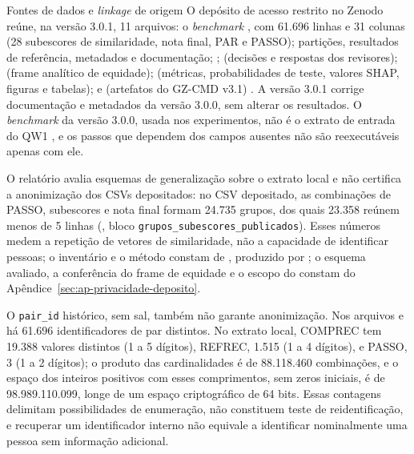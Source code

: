 \begin{chapter}{Fontes de dados e \textit{linkage} de origem}
O depósito de acesso restrito no Zenodo reúne, na versão 3.0.1, 11 arquivos: o \textit{benchmark} , com 61.696 linhas e 31 colunas (28 subescores de similaridade, nota final, PAR e PASSO); partições, resultados de referência, metadados e documentação; ;  (decisões e respostas dos revisores);  (frame analítico de equidade);  (métricas, probabilidades de teste, valores SHAP, figuras e tabelas); e  (artefatos do GZ-CMD v3.1) \cite{Jardim2026zenodo,Jardim2026zenodoGzcmd301}. A versão 3.0.1 corrige documentação e metadados da versão 3.0.0, sem alterar os resultados. O \textit{benchmark} da versão 3.0.0, usada nos experimentos, não é o extrato de entrada do QW1 \cite{Jardim2026zenodoGzcmd}, e os passos que dependem dos campos ausentes não são reexecutáveis apenas com ele.

O relatório  avalia esquemas de generalização sobre o extrato local e não certifica a anonimização dos CSVs depositados: no CSV depositado, as combinações de PASSO, subescores e nota final formam 24.735 grupos, dos quais 23.358 reúnem menos de 5 linhas (, bloco \texttt{grupos\_\allowbreak subescores\_\allowbreak publicados}). Esses números medem a repetição de vetores de similaridade, não a capacidade de identificar pessoas; o inventário e o método constam de , produzido por ; o esquema avaliado, a conferência do frame de equidade e o escopo do  constam do Apêndice~\ref{sec:ap-privacidade-deposito}.

O \texttt{pair\_id} histórico, sem sal, também não garante anonimização. Nos arquivos  e  há 61.696 identificadores de par distintos. No extrato local, COMPREC tem 19.388 valores distintos (1 a 5 dígitos), REFREC, 1.515 (1 a 4 dígitos), e PASSO, 3 (1 a 2 dígitos); o produto das cardinalidades é de 88.118.460 combinações, e o espaço dos inteiros positivos com esses comprimentos, sem zeros iniciais, é de 98.989.110.099, longe de um espaço criptográfico de 64 bits. Essas contagens delimitam possibilidades de enumeração, não constituem teste de reidentificação, e recuperar um identificador interno não equivale a identificar nominalmente uma pessoa sem informação adicional.


\end{chapter}
